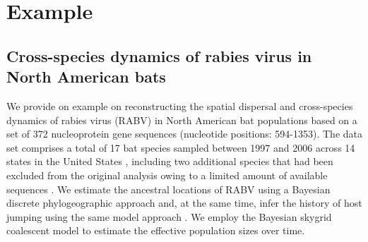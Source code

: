 \documentclass{bioinfo}
\begin{document}
\section*{Example}

\subsection*{Cross-species dynamics of rabies virus in North American bats}

We provide on example on reconstructing the spatial dispersal and cross-species dynamics of rabies virus (RABV) in North American bat populations based on a set of 372 nucleoprotein gene sequences (nucleotide positions: 594-1353). 
The data set comprises a total of 17 bat species sampled between 1997 and 2006 across 14 states in the United States \citep{Streicker}, including two additional species that had been excluded from the original analysis owing to a limited amount of available sequences \citep{Faria2013}.
We estimate the ancestral locations of RABV using a Bayesian discrete phylogeographic approach and, at the same time, infer the history of host jumping using the same model approach \citep{Lemey2009}. 
We employ the Bayesian skygrid coalescent model \citep{gill2012improving} to estimate the effective population sizes over time.
\end{document}
